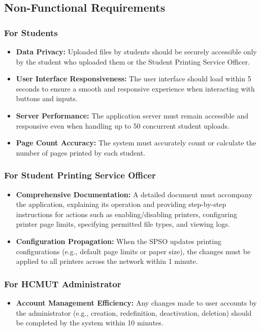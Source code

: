 \subsection{Non-Functional Requirements}

\subsubsection{For Students}
\begin{itemize}
\item \textbf{Data Privacy:} Uploaded files by students should be securely accessible only by the student who uploaded them or the Student Printing Service Officer.
\item \textbf{User Interface Responsiveness:} The user interface should load within 5 seconds to ensure a smooth and responsive experience when interacting with buttons and inputs.
\item \textbf{Server Performance:} The application server must remain accessible and responsive even when handling up to 50 concurrent student uploads.
\item \textbf{Page Count Accuracy:} The system must accurately count or calculate the number of pages printed by each student.
\end{itemize}

\subsubsection{For Student Printing Service Officer}
\begin{itemize}
\item \textbf{Comprehensive Documentation:} A detailed document must accompany the application, explaining its operation and providing step-by-step instructions for actions such as enabling/disabling printers, configuring printer page limits, specifying permitted file types, and viewing logs.
\item \textbf{Configuration Propagation:} When the SPSO updates printing configurations (e.g., default page limits or paper size), the changes must be applied to all printers across the network within 1 minute.
\end{itemize}

\subsubsection{For HCMUT Administrator}
\begin{itemize}
\item \textbf{Account Management Efficiency:} Any changes made to user accounts by the administrator (e.g., creation, redefinition, deactivation, deletion) should be completed by the system within 10 minutes.
\end{itemize}
